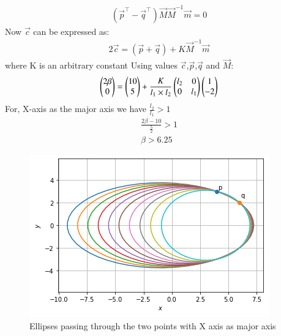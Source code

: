 \documentclass[journal,12pt,twocolumn]{IEEEtran}
\begin{document}
\begin{align}
    (\vec{p}^{\top}-\vec{q}^{\top})\vec{M}\vec{M}^{-1}\vec{m}=0
\end{align}
Now $\vec{c}$ can be expressed as:
\begin{align}
2\vec{c}=(\vec{p}+\vec{q})+K\vec{M}^{-1}\vec{m}
\end{align}
where K is an arbitrary constant
Using values $\vec{c}$,$\vec{p}$,$\vec{q}$ and $\vec{M}$:
\begin{align}
 \begin{pmatrix}2\beta\\0\end{pmatrix}=\begin{pmatrix}10\\5\end{pmatrix}+\frac{K}{l_1\times l_2}\begin{pmatrix}l_2 & 0 \\ 0 & l_1\end{pmatrix}\begin{pmatrix}1\\-2\end{pmatrix}
\end{align}
For, X-axis as the major axis we have  
$\frac{l_2}{l_1}>1$
\begin{align}
    \frac{2\beta-10}{\frac{5}{2}}>1\\
    \beta>6.25
\end{align}
\begin{figure}[!ht]
\centering
\includegraphics[width=\columnwidth]{Ellipse_(I).PNG}
\caption{Ellipses passing through the two points with X axis as major axis}
\label{fig:ellipses}	
\end{figure}
\end{document}
